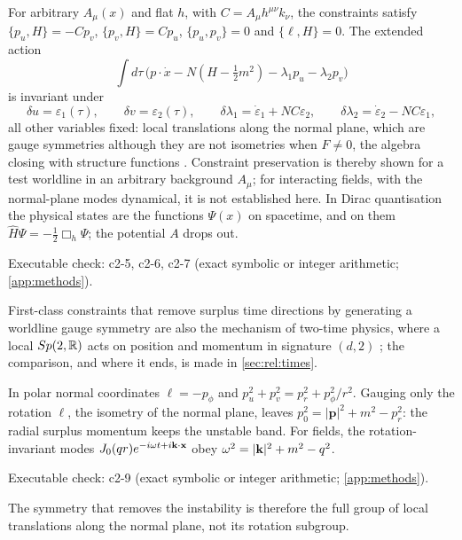 \begin{theorem}
\label{thm:wlgauge}
For arbitrary $A_\mu(x)$ and flat $h$, with $C=A_\mu h^{\mu\nu}k_\nu$, the constraints satisfy $\{p_u,H\}=-Cp_v$, $\{p_v,H\}=Cp_u$, $\{p_u,p_v\}=0$ and $\{\ell,H\}=0$. The extended action
\[
\int d\tau\,\bigl(p\cdot\dot x-N(H-\tfrac12m^2)-\lambda_1p_u-\lambda_2p_v\bigr)
\]
is invariant under
\[
\delta u=\varepsilon_1(\tau),\qquad \delta v=\varepsilon_2(\tau),\qquad \delta\lambda_1=\dot\varepsilon_1+NC\varepsilon_2,\qquad \delta\lambda_2=\dot\varepsilon_2-NC\varepsilon_1,
\]
all other variables fixed: local translations along the normal plane, which are gauge symmetries although they are not isometries when $F\neq0$, the algebra closing with
structure functions \cite{HenneauxTeitelboim92}. Constraint preservation is thereby shown for a test worldline in an arbitrary background $A_\mu$; for interacting fields, with the
normal-plane modes dynamical, it is not established here. In Dirac quantisation the physical states are the functions $\Psi(x)$ on spacetime, and on them $\hat H\Psi=-\tfrac12\Box_h\Psi$;
the potential $A$ drops out.
\end{theorem}

\noindent Executable check: c2-5, c2-6, c2-7 (exact symbolic or integer arithmetic; \cref{app:methods}).

First-class constraints that remove surplus time directions by generating a worldline gauge symmetry are also the mechanism of two-time physics,
where a local $Sp(2,\mathbb{R})$ acts on position and momentum in signature $(d,2)$ \cite{BarsDelidumanAndreev98}; the comparison, and where it ends, is
made in \cref{sec:rel:times}.

\begin{proposition}
\label{prop:isometryonly}
In polar normal coordinates $\ell=-p_\phi$ and $p_u^2+p_v^2=p_r^2+p_\phi^2/r^2$. Gauging only the rotation $\ell$, the isometry of the normal plane, leaves
$p_0^2=|\mathbf p|^2+m^2-p_r^2$: the radial surplus momentum keeps the unstable band. For fields, the rotation-invariant modes $J_0(qr)e^{-i\omega t+i\mathbf k\cdot\mathbf x}$ obey
$\omega^2=|\mathbf k|^2+m^2-q^2$.
\end{proposition}

\noindent Executable check: c2-9 (exact symbolic or integer arithmetic; \cref{app:methods}).

The symmetry that removes the instability is therefore the full group of local translations along the normal plane, not its rotation subgroup.

